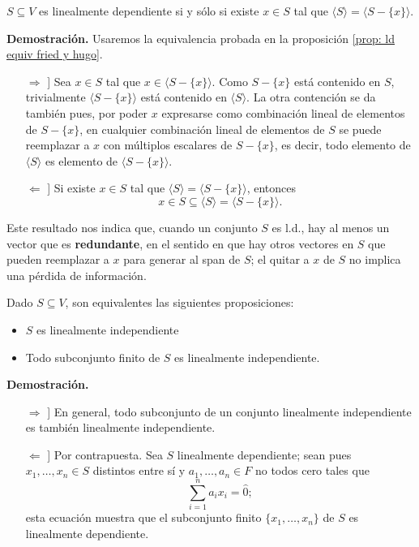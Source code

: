 \begin{prop}
$S \subseteq V$ es linealmente dependiente si y sólo si 
existe $x \in S$ tal que $\langle S \rangle = 
\langle S - \{ x \} \rangle$.
\end{prop}
\noindent
\textbf{Demostración.}
Usaremos la equivalencia probada en la proposición
\ref{prop: ld equiv fried y hugo}.
\begin{itemize}
	\item[$\Rightarrow$]] Sea $x \in S$ tal que 
	$x \in \langle S - \{ x \} \rangle$.
	 Como $S - \{ x \}$ está contenido 
	en $S$, trivialmente $\langle S - \{ x \} \rangle$
	está contenido en $\langle S \rangle$. 
	La otra contención se 
	da también pues, por poder $x$ expresarse como combinación lineal 
	de elementos de $S - \{ x \}$, en cualquier combinación lineal
	de elementos de $S$ se puede reemplazar a $x$ con múltiplos
	escalares de $S-\{ x \}$, es decir, todo elemento
	de $\langle S \rangle$ es elemento de 
	$\langle S - \{ x \} \rangle$.
	\item[$\Leftarrow$]]  Si existe $x \in S$
	tal que $\langle S \rangle = 
	\langle S - \{ x \} \rangle$, entonces
	\[
	x \in S \subseteq \langle S \rangle = 
	\langle S - \{ x \} \rangle.
	\]
	
\end{itemize}

\QEDB
\vspace{0.2cm}

Este resultado nos indica que, cuando un conjunto $S$
es l.d., hay al menos un vector 
que es \textbf{redundante}, en el sentido en que hay otros
vectores en $S$ que pueden reemplazar a $x$ para generar
al span de $S$; el quitar a $x$ de $S$ no implica una pérdida
de información.

\begin{prop}
	\label{prop: li caracter finito}
Dado $S \subseteq V$, son equivalentes las siguientes proposiciones:
\begin{itemize}
	\item $S$ es linealmente independiente
	\item Todo subconjunto finito de $S$ es linealmente independiente.
\end{itemize}
\end{prop}
\noindent
\textbf{Demostración.}

\begin{itemize}
	\item[$\Rightarrow$]] En general, todo subconjunto de un
	conjunto linealmente independiente es también linealmente
	independiente.
	\item[$\Leftarrow$]] Por contrapuesta. Sea
	$S$ linealmente dependiente; sean pues $x_{1}, \ldots , x_{n} \in S$
	distintos entre sí y $a_{1}, \ldots , a_{n} \in F$ no todos cero 
	tales que 
	\[
	\sum_{i=1}^{n} a_{i}x_{i} = \hat{0};
	\] 
	esta ecuación muestra que el subconjunto finito
	$\{ x_{1}, \ldots , x_{n} \}$ de $S$ es linealmente dependiente.
\end{itemize}

